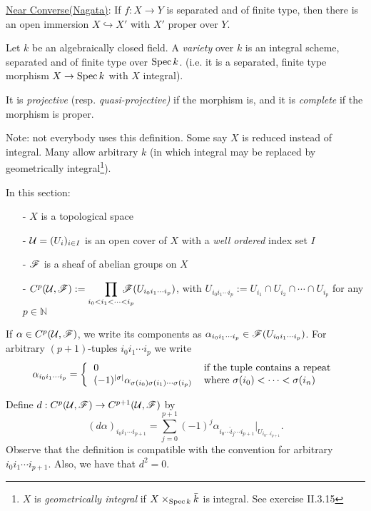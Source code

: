 \underline{Near Converse(Nagata)}: If $f:X\to Y$ is separated and
of finite type, then there is an open immersion $X\hookrightarrow
X'$ with $X'$ proper over $Y$.

\begin{definition}
Let $k$ be an algebraically closed field.  A \emph{variety} over
$k$ is an integral scheme, separated and of finite type over
$\text{\rm Spec\,} k$.  (i.e. it is a separated, finite type morphism $X\to
\text{\rm Spec\,} k$ with $X$ integral).

It is \emph{projective} (resp. \emph{quasi-projective)} if the
morphism is, and it is \emph{complete} if the morphism is proper.
\end{definition}

Note: not everybody uses this definition.  Some say $X$ is reduced
instead of integral.  Many allow arbitrary $k$ (in which integral
may be replaced by geometrically integral\footnote{$X$ is
\emph{geometrically integral} if $X\times_{\text{\rm Spec\,} k} \bar k$ is
integral.  See exercise II.3.15}).

\vspace{8mm} 

In this section:
\begin{itemize}
 \item[-] $X$ is a topological space
 \item[-] $\mathcal{U}=(U_i)_{i\in I}$ is an open cover of $X$ with a
 \emph{well ordered} index set $I$
 \item[-] $\mathscr{F}$ is a sheaf of abelian groups on $X$
 \item[-] $C^p(\U,\F) := \displaystyle\prod_{i_0<i_1< \cdots <
 i_p}\!\!\!\!\!\!\!\!
 \F(U_{i_0 i_1 \cdots i_p})$, with $U_{i_0 i_1 \cdots i_p}:=
 U_{i_1}\cap U_{i_2}\cap \cdots \cap U_{i_p}$ for any $p\in
 \mathbb{N}$
\end{itemize}

If $\alpha\in C^p(\mathcal{U},\mathscr{F})$, we write its components as $\alpha_{i_0
i_1 \cdots i_p}\in \mathscr{F}(U_{i_0 i_1 \cdots i_p})$.  For arbitrary
$(p+1)$-tuples $i_0 i_1 \cdots i_p$ we write
\[
 \alpha_{i_0 i_1 \cdots i_p} = \left\{
 \begin{tabular}{ll}
 0 & if the tuple contains a repeat \\
 $(-1)^{|\sigma|}\alpha_{\sigma (i_0) \sigma( i_1) \cdots \sigma (i_p)}$
 & where $\sigma (i_0) < \cdots < \sigma (i_n)$
 \end{tabular} \right.
 \]

Define $d:C^p(\mathcal{U},\mathscr{F}) \to C^{p+1}(\mathcal{U},\mathscr{F})$ by
\[
    (d\alpha)_{i_0 i_1 \cdots i_{p+1}} = \sum_{j=0}^{p+1} (-1)^j
    \alpha_{i_0 \cdots \hat i_j \cdots i_{p+1}}|_{U_{i_0\cdots i_{p+1}}}.
\]
Observe that the definition is compatible with the convention for
arbitrary $i_0 i_1 \cdots i_{p+1}$.  Also, we have that $d^2=0$.

